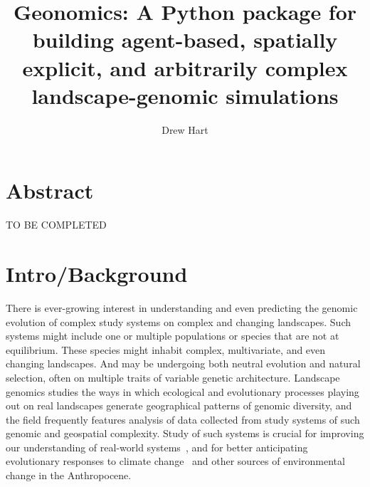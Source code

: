 ﻿\documentclass{article}
\title{Geonomics: A Python package for building agent-based, spatially explicit, and arbitrarily complex landscape-genomic simulations}
\author{Drew Hart}
\begin{document}
\maketitle


\section{Abstract}
{\LARGE TO BE COMPLETED}


\section{Intro/Background}
There is ever-growing interest in understanding and even predicting
the genomic evolution of complex study systems on complex and changing landscapes.
Such systems might include one or multiple populations or species that are not
at equilibrium. These species might inhabit complex, multivariate, and even changing landscapes.
And may be undergoing both neutral evolution and natural selection, often on multiple traits
of variable genetic architecture.
Landscape genomics studies the ways in which ecological and evolutionary processes playing
out on real landscapes generate geographical patterns of genomic diversity,
and the field frequently features analysis of data collected from study systems of such
genomic and geospatial complexity.
Study of such systems is crucial for improving our understanding of real-world systems~\cite{pelletier,barrett},
and for better anticipating evolutionary responses to climate change~\cite{bay}
and other sources of environmental change in the Anthropocene.
\end{document}
